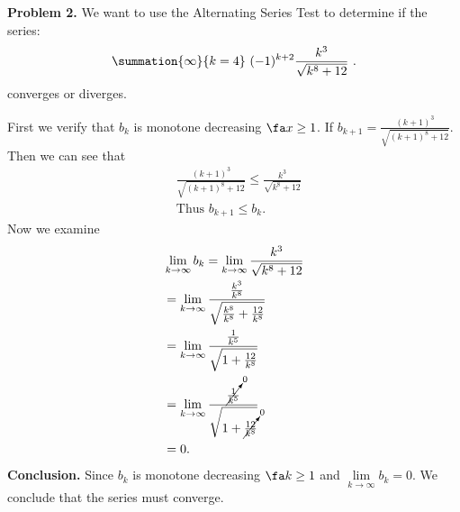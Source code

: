 \documentclass{report}
\begin{document}
    \pagebreak 
    \begin{mdframed}
        \textbf{Problem 2.} We want to use the Alternating Series Test to determine if the series:
        \begin{align*}
            \summation{\infty}{k=4}\ (-1)^{k+2}\frac{k^{3}}{\sqrt{k^{8}+12}}\ 
        .\end{align*}
         converges or diverges.
   \end{mdframed}
   \bigbreak \noindent 
   First we verify that $b_{k}$ is monotone decreasing $\fa x \geq 1$. If $b_{k+1} =  \frac{(k+1)^{3}}{\sqrt{(k+1)^{8} +12}}$. Then we can see that 
   \begin{align*}
       &\frac{(k+1)^{3}}{\sqrt{(k+1)^{8} +12}}  \leq \frac{k^{3}}{\sqrt{k^{8} + 12}}\\
       &\text{Thus }b_{k+1} \leq b_{k}
   .\end{align*}
   \bigbreak \noindent 
   Now we examine
   \begin{align*}
       &\lim\limits_{k \to \infty}{b_{k}} = \lim\limits_{k \to \infty}{\frac{k^{3}}{\sqrt{k^{8} + 12}}} \\
       &=\lim\limits_{k\to \infty}{\frac{\frac{k^{3}}{k^{8}}}{\sqrt{\frac{k^{8}}{k^{8}} +  \frac{12}{k^{8}}}}} \\
       &=\lim\limits_{k \to \infty}{\frac{\frac{1}{k^{5}}}{\sqrt{1+\frac{12}{k^{8}}}}}  \\
       &=\lim\limits_{k \to \infty}{\frac{\cancelto{0}{\frac{1}{k^{5}}}}{\sqrt{1+\cancelto{0}{\frac{12}{k^{8}}}}}}  \\ 
       &=0
   .\end{align*}
   \bigbreak \noindent 
   \textbf{Conclusion.} Since $b_{k}$ is monotone decreasing $\fa k \geq 1$ and $\lim\limits_{k \to \infty}{b_{k}} = 0 $. We conclude that the series must converge.
\end{document}
